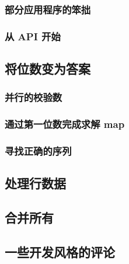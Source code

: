 \documentclass[./main.tex]{subfiles}
\begin{document}
\subsubsection*{部分应用程序的笨拙}

\subsubsection*{从 API 开始}

\subsection*{将位数变为答案}

\subsubsection*{并行的校验数}

\subsubsection*{通过第一位数完成求解 map}

\subsubsection*{寻找正确的序列}

\subsection*{处理行数据}

\subsection*{合并所有}

\subsection*{一些开发风格的评论}
\end{document}
